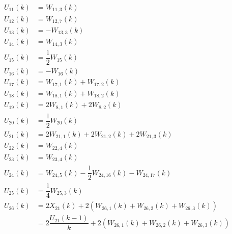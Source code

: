 \begin{align} \label{eq:allRecRel2}
\begin{split}
U_{11} \left(k\right)&= W_{11,3}\left(k\right)\\
U_{12} \left(k\right)&= W_{12,7}\left(k\right)\\
U_{13} \left(k\right)&= -W_{13,3}\left(k\right)\\
U_{14} \left(k\right)&= W_{14,3}\left(k\right)\\
U_{15} \left(k\right)&= \dfrac{1}{2}W_{15}\left(k\right)\\
U_{16} \left(k\right)&= -W_{16}\left(k\right)\\
U_{17} \left(k\right)&= W_{17,1}\left(k\right)+W_{17,2}\left(k\right)\\
U_{18} \left(k\right)&= W_{18,1}\left(k\right)+W_{18,2}\left(k\right)\\
U_{19} \left(k\right)&= 2W_{8,1}\left(k\right)+2W_{8,2}\left(k\right)\\
U_{20} \left(k\right)&= \dfrac{1}{2}W_{20}\left(k\right)\\
U_{21} \left(k\right)&= 2W_{21,1}\left(k\right)+2W_{21,2}\left(k\right)+2W_{21,3}\left(k\right)\\
U_{22} \left(k\right)&= W_{22,4}\left(k\right)\\
U_{23} \left(k\right)&= W_{23,4}\left(k\right)\\
U_{24} \left(k\right)&=  W_{24,5}\left(k\right)-\dfrac{1}{2}W_{24,16}\left(k\right)-W_{24,17}\left(k\right)\\
U_{25} \left(k\right)&=  \dfrac{1}{4}W_{25,3}\left(k\right)\\
U_{26} \left(k\right)&=  2X_{21}\left(k\right)+2\left(W_{26,1}\left(k\right)+W_{26,2}\left(k\right)+W_{26,3}\left(k\right)\right)\\
&=2\dfrac{U_{21}\left(k-1\right)}{k}+2\left(W_{26,1}\left(k\right)+W_{26,2}\left(k\right)+W_{26,3}\left(k\right)\right)\\
\end{split}
\end{align}

